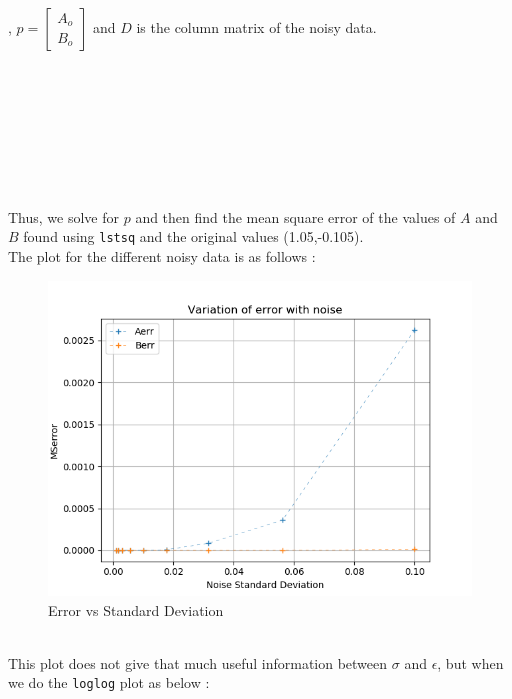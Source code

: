 \documentclass[11pt, a4paper]{article}
\begin{document}
, $p=\left[\begin{matrix}
    A_o\\B_o
\end{matrix}\right]$
and $D$ is the column matrix of the noisy data.
\\\\\\\\\\\\\\\\\\Thus, we solve for $p$ and then find the mean square error of the values of $A$ and $B$ found using \texttt{lstsq} and the original values (1.05,-0.105). \\The plot for the different noisy data is as follows :
\begin{figure}[!tbh]
    \centering
    \includegraphics[scale=0.5]{./../Extras/ErrorwithStd.png}  %
    \caption{Error vs Standard Deviation}
    \label{fig:errorstd}
\end{figure}
\\This plot does not give that much useful information between $\sigma$ and $\epsilon$, but when we do the \texttt{loglog} plot as below :
\end{document}
